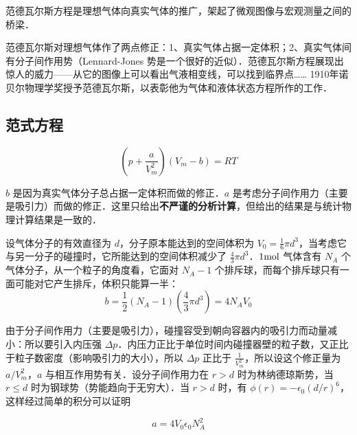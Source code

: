 
范德瓦尔斯方程是理想气体向真实气体的推广，架起了微观图像与宏观测量之间的桥梁．

范德瓦尔斯对理想气体作了两点修正：1、真实气体占据一定体积；2、真实气体间有分子间作用势（Lennard-Jones 势是一个很好的近似）．范德瓦尔斯方程展现出惊人的威力——从它的图像上可以看出气液相变线，可以找到临界点…… 1910年诺贝尔物理学奖授予范德瓦尔斯，以表彰他为气体和液体状态方程所作的工作．

\subsection{范式方程}

\begin{equation}
\left(p+\frac{a}{V_m^2}\right)(V_m-b)=RT
\end{equation}

$b$ 是因为真实气体分子总占据一定体积而做的修正．$a$ 是考虑分子间作用力（主要是吸引力）而做的修正．这里只给出\textbf{不严谨的分析计算}，但给出的结果是与统计物理计算结果是一致的．

设气体分子的有效直径为 $d$，分子原本能达到的空间体积为 $V_0=\frac{1}{6}\pi d^3$，当考虑它与另一分子的碰撞时，它所能达到的空间体积减少了 $\frac{4}{3}\pi d^3$．$1\rm mol$ 气体含有 $N_A$ 个气体分子，从一个粒子的角度看，它面对 $N_A-1$ 个排斥球，而每个排斥球只有一面可能对它产生排斥，体积只能算一半：
\begin{equation}
b=\frac{1}{2}(N_A-1)(\frac{4}{3}\pi d^3)=4N_A V_0
\end{equation}

由于分子间作用力（主要是吸引力），碰撞容受到朝向容器内的吸引力而动量减小：所以要引入内压强 $\Delta p$．内压力正比于单位时间内碰撞器壁的粒子数，又正比于粒子数密度（影响吸引力的大小），所以 $\Delta p$ 正比于 $\frac{1}{V_m^2}$，所以设这个修正量为 $a/V_m^2$，$a$ 与相互作用势有关．设分子间作用力在 $r>d$ 时为林纳德琼斯势，当 $r\le d$ 时为钢球势（势能趋向于无穷大）．当 $r>d$ 时，有 $\phi(r)=-\epsilon_0(d/r)^6$，这样经过简单的积分可以证明

\begin{equation}
a=4V_0\epsilon_0 N_A^2
\end{equation}
